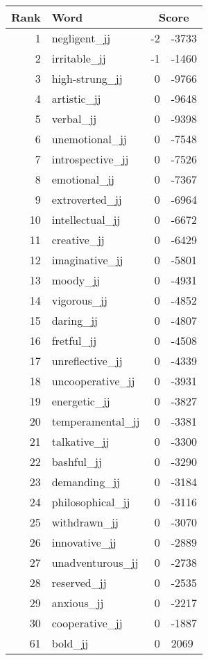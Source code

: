 \begin{longtable}[!htbp]{| rlr@{.}l |}
    \hline
    \textbf{Rank} & \textbf{Word} & \multicolumn{2}{c|}{\textbf{Score}} \\
    \hline
    \endhead
    1 & negligent\_jj & -2 & -3733 \\
    2 & irritable\_jj & -1 & -1460 \\
    3 & high-strung\_jj & 0 & -9766 \\
    4 & artistic\_jj & 0 & -9648 \\
    5 & verbal\_jj & 0 & -9398 \\
    6 & unemotional\_jj & 0 & -7548 \\
    7 & introspective\_jj & 0 & -7526 \\
    8 & emotional\_jj & 0 & -7367 \\
    9 & extroverted\_jj & 0 & -6964 \\
    10 & intellectual\_jj & 0 & -6672 \\
    11 & creative\_jj & 0 & -6429 \\
    12 & imaginative\_jj & 0 & -5801 \\
    13 & moody\_jj & 0 & -4931 \\
    14 & vigorous\_jj & 0 & -4852 \\
    15 & daring\_jj & 0 & -4807 \\
    16 & fretful\_jj & 0 & -4508 \\
    17 & unreflective\_jj & 0 & -4339 \\
    18 & uncooperative\_jj & 0 & -3931 \\
    19 & energetic\_jj & 0 & -3827 \\
    20 & temperamental\_jj & 0 & -3381 \\
    21 & talkative\_jj & 0 & -3300 \\
    22 & bashful\_jj & 0 & -3290 \\
    23 & demanding\_jj & 0 & -3184 \\
    24 & philosophical\_jj & 0 & -3116 \\
    25 & withdrawn\_jj & 0 & -3070 \\
    26 & innovative\_jj & 0 & -2889 \\
    27 & unadventurous\_jj & 0 & -2738 \\
    28 & reserved\_jj & 0 & -2535 \\
    29 & anxious\_jj & 0 & -2217 \\
    30 & cooperative\_jj & 0 & -1887 \\
    61 & bold\_jj & 0 & 2069 \\

\end{longtable}
